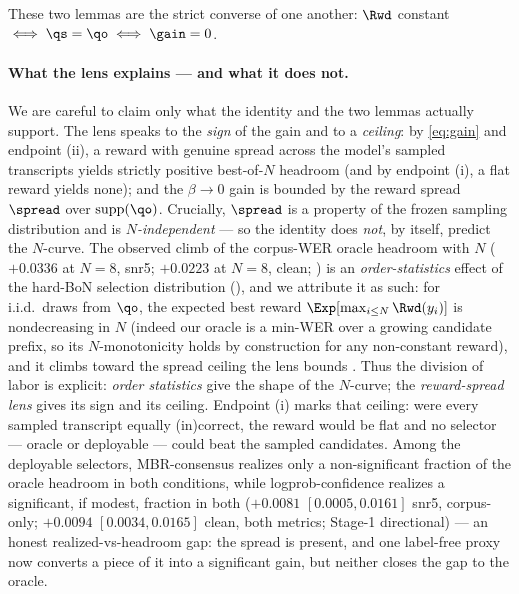 These two lemmas are the strict converse of one another: $\Rwd$ constant $\iff \qs=\qo \iff \gain=0$.

\paragraph{What the lens explains --- and what it does not.}
We are careful to claim only what the identity and the two lemmas actually support. The lens speaks to
the \emph{sign} of the gain and to a \emph{ceiling}: by \eqref{eq:gain} and endpoint (ii), a reward with
genuine spread across the model's sampled transcripts yields strictly positive best-of-$N$ headroom (and
by endpoint (i), a flat reward yields none); and the $\beta\to0$ gain is bounded by the reward spread
$\spread$ over $\operatorname{supp}(\qo)$. Crucially, $\spread$ is a property of the frozen sampling
distribution and is \emph{$N$-independent} --- so the identity does \emph{not}, by itself, predict the
$N$-curve. The observed climb of the corpus-WER oracle headroom with $N$ ($+0.0336$ at $N{=}8$, snr5;
$+0.0223$ at $N{=}8$, clean; ) is an \emph{order-statistics} effect of the hard-BoN
selection distribution (), and
we attribute it as such: for i.i.d.\ draws from $\qo$, the expected best reward $\Exp[\max_{i\le N}\Rwd(y_i)]$
is nondecreasing in $N$ (indeed our oracle is a min-WER over a growing candidate prefix, so its
$N$-monotonicity holds by construction for any non-constant reward), and it climbs toward the spread
ceiling the lens bounds \citep{beirami2024bon,verdun2025softbon}. Thus the division of labor is explicit:
\emph{order statistics} give the shape of the $N$-curve; the \emph{reward-spread lens} gives its sign and
its ceiling. Endpoint (i) marks that ceiling: were every sampled transcript equally (in)correct, the reward
would be flat and no selector --- oracle or deployable --- could beat the sampled candidates. Among the
deployable selectors, MBR-consensus realizes only a non-significant fraction of the oracle headroom in
both conditions, while logprob-confidence realizes a significant, if modest, fraction in both
($+0.0081$ $[0.0005,0.0161]$ snr5, corpus-only; $+0.0094$ $[0.0034,0.0165]$ clean, both metrics; Stage-1
directional) --- an honest realized-vs-headroom gap: the spread is present, and one label-free proxy now
converts a piece of it into a significant gain, but neither closes the gap to the oracle.

